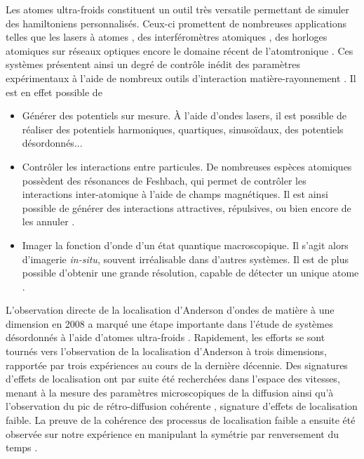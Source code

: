Les atomes ultra-froids constituent un outil très versatile permettant de simuler des hamiltoniens personnalisés. Ceux-ci promettent de nombreuses applications telles que les lasers à atomes \citep{robins2013atom}, des interféromètres atomiques \citep{canuel2014matter}, des horloges atomiques sur réseaux optiques \citep{derevianko2011colloquium} encore le domaine récent de l'atomtronique \citep{eckel2014hysteresis}. Ces systèmes présentent ainsi un degré de contrôle inédit des paramètres expérimentaux à l'aide de nombreux outils d'interaction matière-rayonnement \citep{bloch2012quantum}. Il est en effet possible de
\begin{itemize}
\item[\textendash] Générer des potentiels sur mesure. À l'aide d'ondes lasers, il est possible de réaliser des potentiels harmoniques, quartiques, sinusoïdaux, des potentiels désordonnés...
\item[\textendash] Contrôler les interactions entre particules. De nombreuses espèces atomiques possèdent des résonances de Feshbach, qui permet de contrôler les interactions inter-atomique à l'aide de champs magnétiques. Il est ainsi possible de générer des interactions attractives, répulsives, ou bien encore de les annuler \citep{walraven2010elements}.
\item[\textendash] Imager la fonction d'onde d'un état quantique macroscopique. Il s'agit alors d'imagerie \emph{in-situ}, souvent irréalisable dans d'autres systèmes. Il est de plus possible d'obtenir une grande résolution, capable de détecter un unique atome \citep{ott2016single}.
\end{itemize}



L'observation directe de la localisation d'Anderson d'ondes de matière à une dimension en 2008 a marqué une étape importante dans l'étude de systèmes désordonnés à l'aide d'atomes ultra-froids \citep{roati2008anderson}\citep{billy2008direct}. Rapidement, les efforts se sont tournés vers l'observation de la localisation d'Anderson à trois dimensions, rapportée par trois expériences \citep{kondov2011three}\citep{jendrzejewski2012three}\citep{semeghini2015measurement} au cours de la dernière décennie. Des signatures d'effets de localisation ont par suite été recherchées dans l'espace des vitesses, menant à la mesure des paramètres microscopiques de la diffusion \citep{richard2019elastic} ainsi qu'à l'observation du pic de rétro-diffusion cohérente \citep{jendrzejewski2012coherent}, signature d'effets de localisation faible. La preuve de la cohérence des processus de localisation faible a ensuite été observée sur notre expérience en manipulant la symétrie par renversement du temps \citep{muller2015suppression}.

